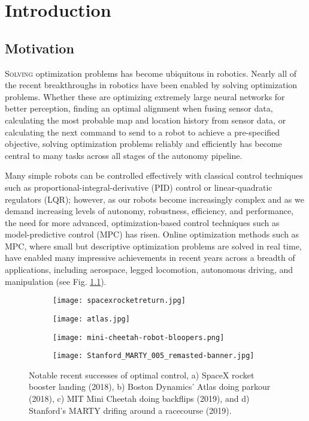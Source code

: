 \documentclass[../root.tex]{subfiles}
\begin{document}
\chapter{Introduction}
\section{Motivation}
\lettrine{S}{olving} optimization problems has become ubiquitous in robotics.
Nearly all of the recent breakthroughs in robotics have been enabled by solving 
optimization problems. Whether these are optimizing extremely large neural networks 
for better perception, finding an optimal alignment when fusing sensor data, calculating
the most probable map and location history from sensor data, or calculating the next 
command to send to a robot to achieve a pre-specified objective, solving optimization
problems reliably and efficiently has become central to many tasks across all stages of 
the autonomy pipeline. 

Many simple robots can be controlled effectively with classical control techniques 
such as proportional-integral-derivative (PID) control or linear-quadratic regulators (LQR);
however, as our robots become increasingly complex and as we demand increasing levels of autonomy, 
robustness, efficiency, and performance, the need for more advanced, optimization-based control 
techniques such as model-predictive control (MPC) has risen. 
Online optimization methods such as MPC, where small but descriptive optimization problems 
are solved in real time, have enabled many impressive achievements in recent years across
a breadth of applications, including aerospace, legged locomotion, autonomous driving,
and manipulation (see Fig. \ref{fig:applications}).

\begin{figure}[t]
    \centering
    \begin{subfigure}[b]{0.24\columnwidth}
        \texttt{[image: spacexrocketreturn.jpg]} 
        \caption{}
    \end{subfigure}
    \begin{subfigure}[b]{0.24\columnwidth}
        \texttt{[image: atlas.jpg]} 
        \caption{}
    \end{subfigure}
    \begin{subfigure}[b]{0.24\columnwidth}
        \texttt{[image: mini-cheetah-robot-bloopers.png]} 
        \caption{}
    \end{subfigure}
    \begin{subfigure}[b]{0.24\columnwidth}
        \texttt{[image: Stanford\_MARTY\_005\_remasted-banner.jpg]} 
        \caption{}
    \end{subfigure}
    \caption{Notable recent successes of optimal control, a) SpaceX rocket
    booster landing (2018), b) Boston Dynamics' Atlas doing parkour (2018), c)
    MIT Mini Cheetah doing backflips (2019), and d) Stanford's MARTY drifing
    around a racecourse (2019).}
    \label{fig:applications}
\end{figure}
\end{document}
